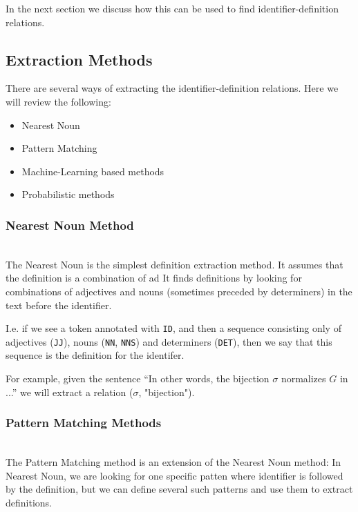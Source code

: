 In the next section we discuss how this can be used to find identifier-definition
relations.


\subsection{Extraction Methods} \label{sec:definition-extraction-methods}
There are several ways of extracting the identifier-definition relations.
Here we will review the following:

\begin{itemize}
\itemsep1pt\parskip0pt
  \item Nearest Noun
  \item Pattern Matching
  \item Machine-Learning based methods
  \item Probabilistic methods
\end{itemize}


\subsubsection{Nearest Noun Method}

\ \\

The Nearest Noun  \cite{grigore2009towards} \cite{yokoi2011contextual}
is the simplest definition extraction method.
It assumes that the definition is a combination of ad
It finds definitions by looking for combinations of adjectives and nouns
(sometimes preceded by determiners) in the text before the identifier.

I.e. if we see a token annotated with \texttt{ID}, and then a sequence
consisting only of adjectives (\texttt{JJ}), nouns (\texttt{NN}, \texttt{NNS})
and determiners (\texttt{DET}), then we say that this sequence is
the definition for the identifer.

For example, given the sentence ``In other words, the bijection $\sigma$ normalizes
$G$ in ...'' we will extract a relation ($\sigma$, "bijection").



\subsubsection{Pattern Matching Methods} \label{sec:pattern-matching}

\ \\

The Pattern Matching method \cite{quoc2010mining} is an extension of the
Nearest Noun method: In Nearest Noun, we are looking for one specific patten
where identifier is followed by the definition, but we can define several such
patterns and use them to extract definitions.

